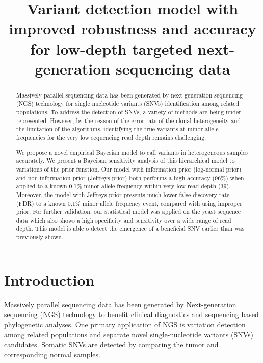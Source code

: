 \documentclass[11pt,reqno]{amsart}
\title[RVD3]{Variant detection model with improved robustness and accuracy for low-depth targeted next-generation sequencing data}
\author{}
\begin{document}
\begin{abstract}
Massively parallel sequencing data has been generated by next-generation sequencing (NGS) technology for single nucleotide variants (SNVs) identification among related populations.
To address the detection of SNVs, a variety of methods are being under-represented.
However, by the reason of the error rate of the clonal heterogeneity and the limitation of the algorithms, identifying the true variants at minor allele frequencies for the very low sequencing read depth remains challenging.

We propose a novel empirical Bayesian model to call variants in heterogeneous samples accurately. We present a Bayeisan sensitivity analysis of this hierarchical model to variations of the prior funstion.
Our model with information prior (log-normal prior) and non-information prior (Jeffreys prior) both performs a high accuracy (96\%) when applied to a known 0.1\% minor allele frequency within very low read depth (39).
Moreover, the model with Jeffreys prior presents much lower false discovery rate (FDR) to a known 0.1\% minor allele frequency event, compared with using improper prior.
For further validation, our statistical model was applied on the yeast sequence data which also shows a high specificity and sensitivity over a wide range of read depth.
This model is able o detect the emergence of a beneficial SNV earlier than was previously shown.

\end{abstract}

\maketitle

\section{Introduction}

Massively parallel sequencing data has been generated by Next-generation sequencing (NGS) technology to benefit clinical diagnostics and sequencing based phylogenetic analyses.
One primary application of NGS is variation detection among related populations and separate novel single-nucleotide variants (SNVs) candidates.
Somatic SNVs are detected by comparing the tumor and corresponding normal samples.
\end{document}
